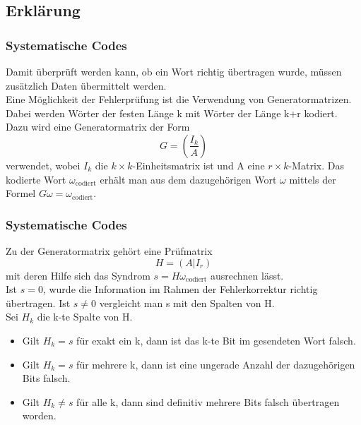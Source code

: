 \subsection{Erklärung}
\begin{frame}
	\frametitle{Systematische Codes}
	Damit überprüft werden kann, ob ein Wort richtig übertragen wurde, müssen zusätzlich Daten übermittelt werden.\\
	Eine Möglichkeit der Fehlerprüfung ist die Verwendung von Generatormatrizen.\\ 
	Dabei werden Wörter der festen Länge k mit Wörter der Länge k+r kodiert. Dazu wird eine Generatormatrix der Form \[G=\left(\frac{I_k}{A}\right)\] verwendet, wobei $I_k$ die $k \times k$-Einheitsmatrix ist und A eine $r \times k$-Matrix. Das kodierte Wort $\omega_{\text{codiert}}$ erhält man aus dem dazugehörigen Wort $\omega$ mittels der Formel $G\omega=\omega_{\text{codiert}}.$\\
\end{frame}
\begin{frame}
	\frametitle{Systematische Codes}
	Zu der Generatormatrix gehört eine Prüfmatrix \[H=\left(A|I_r\right)\] mit deren Hilfe sich das Syndrom $s=H\omega_{\text{codiert}}$ ausrechnen lässt.\\ Ist $s=0$, wurde die Information im Rahmen der Fehlerkorrektur richtig übertragen. Ist $s\not = 0$ vergleicht man s mit den Spalten von H.\\ Sei $H_k$ die k-te Spalte von H.
	\begin{itemize}
	\item Gilt $H_k=s$ für exakt ein k, dann ist das k-te Bit im gesendeten Wort falsch.
	\item Gilt $H_k=s$ für mehrere k, dann ist eine ungerade Anzahl der dazugehörigen Bits falsch.
	\item Gilt $H_k\not=s$ für alle k, dann sind definitiv mehrere Bits falsch übertragen worden.
	\end{itemize}
\end{frame}

